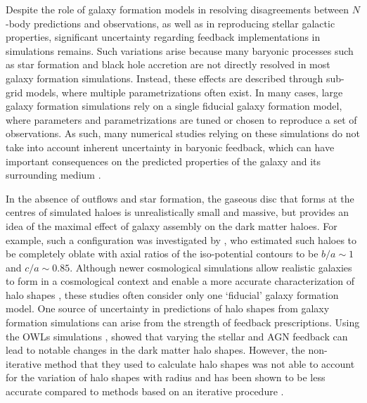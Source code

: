 \documentclass[fleqn,usenatbib]{mnras}
\begin{document}
Despite the role of galaxy formation models in resolving disagreements between $N$-body predictions and observations, as well as in reproducing stellar galactic properties, significant uncertainty regarding feedback implementations in simulations remains.
Such variations arise because many baryonic processes such as star formation and black hole accretion are not directly resolved in most galaxy formation simulations.
Instead, these effects are described through sub-grid models, where  multiple parametrizations often exist.
In many cases, large galaxy formation simulations rely on a single fiducial galaxy formation model, where parameters and parametrizations are tuned or chosen to reproduce a set of observations.
As such, many numerical studies relying on these simulations do not take into account inherent uncertainty in baryonic feedback, which can have important consequences on the predicted properties of the galaxy and its surrounding medium \citep[e.g.][]{Suresh15v448}.


In the absence of outflows and star formation, the gaseous disc that forms at the centres of simulated  haloes is unrealistically small and massive, but provides an idea of the maximal effect of galaxy assembly on the dark matter haloes.
For example, such a configuration was investigated by \cite{Abadi10v407}, who estimated such haloes to be completely oblate with axial ratios of the iso-potential contours to be $b/a \sim 1$ and $c/a \sim 0.85$.
Although newer cosmological simulations allow realistic galaxies to form in a cosmological context and enable a more accurate characterization of halo shapes \citep[e.g.][]{Butsky16v462,Chua19v484,Prada19v490, Emami2021v913}, these studies often consider only one `fiducial' galaxy formation model.
One source of uncertainty in predictions of halo shapes from galaxy formation simulations can arise from the strength of feedback prescriptions. 
Using the OWLs simulations \citep{Schaye10v402}, \cite{Bryan13v429} showed that varying the stellar and AGN feedback can lead to notable changes in the dark matter halo shapes.
However, the non-iterative method that they used to calculate halo shapes was not able to account for the variation of halo shapes with radius and has been shown to be less accurate compared to methods based on an iterative procedure \citep{Zemp11v197}.
\end{document}
